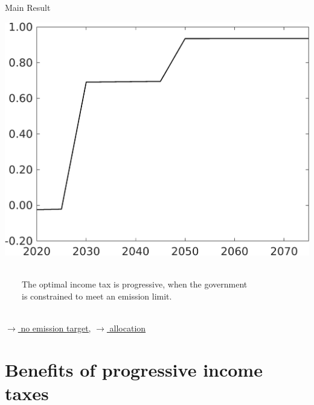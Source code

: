 \documentclass[11pt,aspectratio=169]{beamer}
\begin{document}
\begin{frame}{Main Result}
\begin{minipage}[]{0.32\textwidth}
	\includegraphics[width=1\textwidth]{../codding_model/own_basedOnFried/optimalPol_elastS_DisuSci/figures/all_1705/Single_OPT_T_NoTaus_tauf_spillover0_sep1_BN0_ineq0_red0_etaa0.79.png}
	\end{minipage}

\vspace{5mm}
\begin{block}{}
	\ \\
	\ \ \ \  The optimal income tax is progressive, when the government  \\ \ \ \ \ is constrained to meet an emission limit. \  \ \\ \ 
\end{block}
	\vspace{-2mm}
\hfill
\hyperlink{notopt}{\tiny{$\rightarrow$ no emission target,}} 
\hyperlink{alloc}{\tiny{$\rightarrow$ allocation}} 
\hypertarget{backmainres}{}
\end{frame}




\hypertarget{benf}{}
\section*{Benefits of progressive income taxes}
\end{document}
